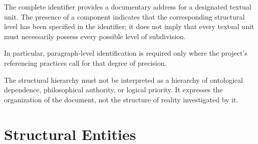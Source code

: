 \begin{center}
\small
\setlength{\tabcolsep}{4pt}
\renewcommand{\arraystretch}{1.15}
\end{center}

The complete identifier provides a documentary address
for a designated textual unit. The presence of a component
indicates that the corresponding structural level has been
specified in the identifier; it does not imply that every
textual unit must necessarily possess every possible level
of subdivision.

In particular, paragraph-level identification is required
only where the project's referencing practices call for
that degree of precision.

The structural hierarchy must not be interpreted as a
hierarchy of ontological dependence, philosophical authority,
or logical priority. It expresses the organization of the
document, not the structure of reality investigated by it.



\section*{Structural Entities}

